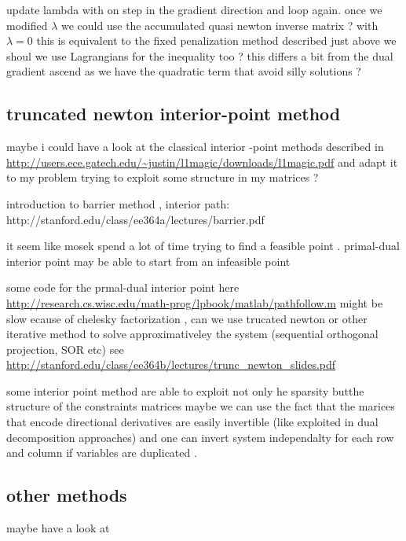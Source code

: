 \documentclass[11pt]{article}
\begin{document}
   update lambda with on step in the gradient direction and loop again.
once we modified $\lambda$ we could use the accumulated quasi newton inverse matrix ? with $\lambda=0$ this is equivalent to the fixed penalization method described just above
we shoul we use Lagrangians for the inequality too ? 
this differs a bit from the dual gradient ascend as we have the quadratic term that avoid silly solutions ?  








\subsection{truncated newton interior-point method}
maybe i could have a look at the classical interior -point  methods described in 
\url{http://users.ece.gatech.edu/~justin/l1magic/downloads/l1magic.pdf}
and adapt it to my problem trying to exploit some structure in my matrices ? 

introduction to barrier method , interior path: 
http://stanford.edu/class/ee364a/lectures/barrier.pdf

it seem like mosek spend a lot of time trying to find a feasible point 
.
  primal-dual interior point
may be able to start from an infeasible point

some code for the prmal-dual interior point here
\url{http://research.cs.wisc.edu/math-prog/lpbook/matlab/pathfollow.m}
might be slow ecause of chelesky factorization , 
can we use trucated newton or other iterative method to solve approximativeley the system (sequential orthogonal projection, SOR etc)
see \url{http://stanford.edu/class/ee364b/lectures/trunc_newton_slides.pdf}

some interior point method are able to exploit not only he sparsity butthe structure of the constraints matrices
maybe we can use the fact that the marices that encode directional derivatives are easily invertible (like exploited  in dual decomposition approaches) and one can invert system independalty for each row and column if variables are duplicated .
 



\subsection{other methods}
maybe have a look at \cite{Evtushenko2005}






%



\end{document}
